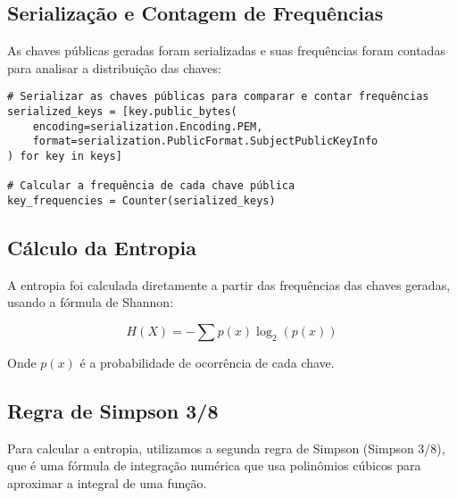 \documentclass{article}
\begin{document}
    \subsection{Serialização e Contagem de Frequências}

    As chaves públicas geradas foram serializadas e suas frequências foram contadas para analisar a distribuição das chaves:

    \begin{verbatim}
# Serializar as chaves públicas para comparar e contar frequências
serialized_keys = [key.public_bytes(
    encoding=serialization.Encoding.PEM,
    format=serialization.PublicFormat.SubjectPublicKeyInfo
) for key in keys]

# Calcular a frequência de cada chave pública
key_frequencies = Counter(serialized_keys)
    \end{verbatim}

    \subsection{Cálculo da Entropia}

    A entropia foi calculada diretamente a partir das frequências das chaves geradas, usando a fórmula de Shannon:

    \[
    H(X) = -\sum p(x) \log_2(p(x))
    \]

    Onde \( p(x) \) é a probabilidade de ocorrência de cada chave.


\subsection{Regra de Simpson 3/8}

Para calcular a entropia, utilizamos a segunda regra de Simpson (Simpson 3/8), que é uma fórmula de integração numérica que usa polinômios cúbicos para aproximar a integral de uma função.
\end{document}
